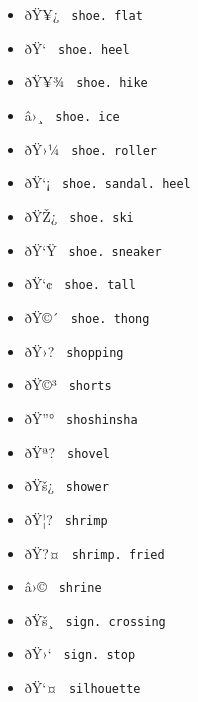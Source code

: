 \begin{itemize}
\item
  \label{symbol-shoe.flat}{{ ðŸ¥¿ }
  \texttt{\ shoe.\ flat\ }}
\item
  \label{symbol-shoe.heel}{{ ðŸ` }
  \texttt{\ shoe.\ heel\ }}
\item
  \label{symbol-shoe.hike}{{ ðŸ¥¾ }
  \texttt{\ shoe.\ hike\ }}
\item
  \label{symbol-shoe.ice}{{ â›¸ }
  \texttt{\ shoe.\ ice\ }}
\item
  \label{symbol-shoe.roller}{{ ðŸ›¼ }
  \texttt{\ shoe.\ roller\ }}
\item
  \label{symbol-shoe.sandal.heel}{{ ðŸ`¡ }
  \texttt{\ shoe.\ sandal.\ heel\ }}
\item
  \label{symbol-shoe.ski}{{ ðŸŽ¿ }
  \texttt{\ shoe.\ ski\ }}
\item
  \label{symbol-shoe.sneaker}{{ ðŸ`Ÿ }
  \texttt{\ shoe.\ sneaker\ }}
\item
  \label{symbol-shoe.tall}{{ ðŸ`¢ }
  \texttt{\ shoe.\ tall\ }}
\item
  \label{symbol-shoe.thong}{{ ðŸ©´ }
  \texttt{\ shoe.\ thong\ }}
\item
  \label{symbol-shopping}{{ ðŸ›? } \texttt{\ shopping\ }}
\item
  \label{symbol-shorts}{{ ðŸ©³ } \texttt{\ shorts\ }}
\item
  \label{symbol-shoshinsha}{{ ðŸ''° }
  \texttt{\ shoshinsha\ }}
\item
  \label{symbol-shovel}{{ ðŸª? } \texttt{\ shovel\ }}
\item
  \label{symbol-shower}{{ ðŸš¿ } \texttt{\ shower\ }}
\item
  \label{symbol-shrimp}{{ ðŸ¦? } \texttt{\ shrimp\ }}
\item
  \label{symbol-shrimp.fried}{{ ðŸ?¤ }
  \texttt{\ shrimp.\ fried\ }}
\item
  \label{symbol-shrine}{{ â›© } \texttt{\ shrine\ }}
\item
  \label{symbol-sign.crossing}{{ ðŸš¸ }
  \texttt{\ sign.\ crossing\ }}
\item
  \label{symbol-sign.stop}{{ ðŸ›` }
  \texttt{\ sign.\ stop\ }}
\item
  \label{symbol-silhouette}{{ ðŸ`¤ }
  \texttt{\ silhouette\ }}

\end{itemize}
